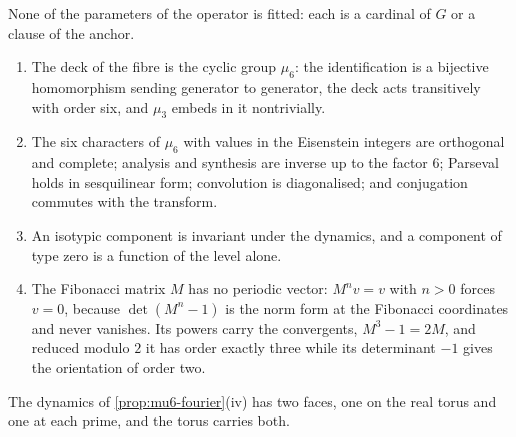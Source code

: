 None of the parameters of the operator is fitted: each is a cardinal of $G$ or a clause of
the anchor.

\begin{proposition}\label{prop:mu6-fourier}
\begin{enumerate}[label=\textup{(\roman*)}]
  \item The deck of the fibre is the cyclic group $\mu_6$: the identification is a
    bijective homomorphism sending generator to generator, the deck acts transitively
    with order six, and $\mu_3$ embeds in it nontrivially.
  \item The six characters of $\mu_6$ with values in the Eisenstein integers are
    orthogonal and complete; analysis and synthesis are inverse up to the factor $6$;
    Parseval holds in sesquilinear form; convolution is diagonalised; and conjugation
    commutes with the transform.
  \item An isotypic component is invariant under the dynamics, and a component of type
    zero is a function of the level alone.
  \item The Fibonacci matrix $M$ has no periodic vector: $M^n v=v$ with $n>0$ forces
    $v=0$, because $\det(M^n-1)$ is the norm form at the Fibonacci coordinates and never
    vanishes.  Its powers carry the convergents, $M^3-1=2M$, and reduced modulo $2$ it
    has order exactly three while its determinant $-1$ gives the orientation of order two.
\end{enumerate}
%
\end{proposition}

The dynamics of \cref{prop:mu6-fourier}(iv) has two faces, one on the real torus and one at each prime, and the
torus carries both.

